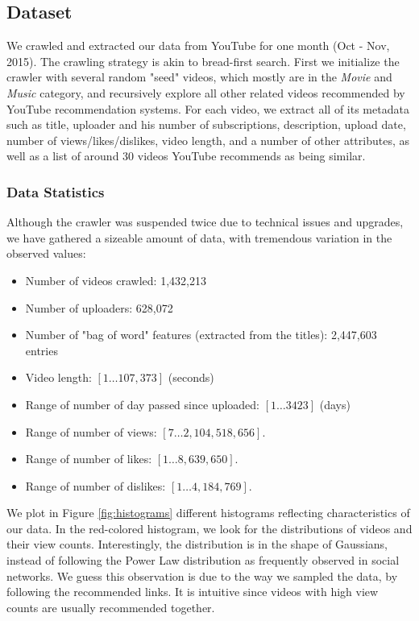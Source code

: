 \subsection{Dataset}
	We crawled and extracted our data from YouTube for one month (Oct - Nov, 2015). The crawling strategy is akin to bread-first search. First we initialize the crawler with several random "seed" videos, which mostly are in the \textit{Movie} and \textit{Music} category, and recursively explore all other related videos recommended by YouTube recommendation systems. For each video, we extract all of its metadata such as title, uploader and his number of subscriptions, description, upload date, number of views/likes/dislikes, video length, and a number of other attributes, as well as a list of around 30 videos YouTube recommends as being similar. 

	\subsubsection{Data Statistics}
		Although the crawler was suspended twice due to technical issues and upgrades, we have gathered a sizeable amount of data, with tremendous variation in the observed values:
		
		\begin{itemize}
			\item Number of videos crawled: 1,432,213
			\item Number of uploaders: 628,072
			\item Number of "bag of word" features (extracted from the titles): 2,447,603 entries
			\item Video length: $[1 \ldots 107,373]$ (seconds)
			\item Range of number of day passed since uploaded: $[1 \ldots 3423]$ (days)
			\item Range of number of views: $[7 \ldots 2,104,518,656]$.
			\item Range of number of likes: $[1 \ldots 8,639,650]$.
			\item Range of number of dislikes: $[1 \ldots 4,184,769]$.
		\end{itemize}

		We plot in Figure \ref{fig:histograms} different histograms reflecting characteristics of our data. In the red-colored histogram, we look for the distributions of videos and their view counts. Interestingly, the distribution is in the shape of Gaussians, instead of following the Power Law distribution as frequently observed in social networks. We guess this observation is due to the way we sampled the data, by following the recommended links. It is intuitive since videos with high view counts are usually recommended together. 
		
